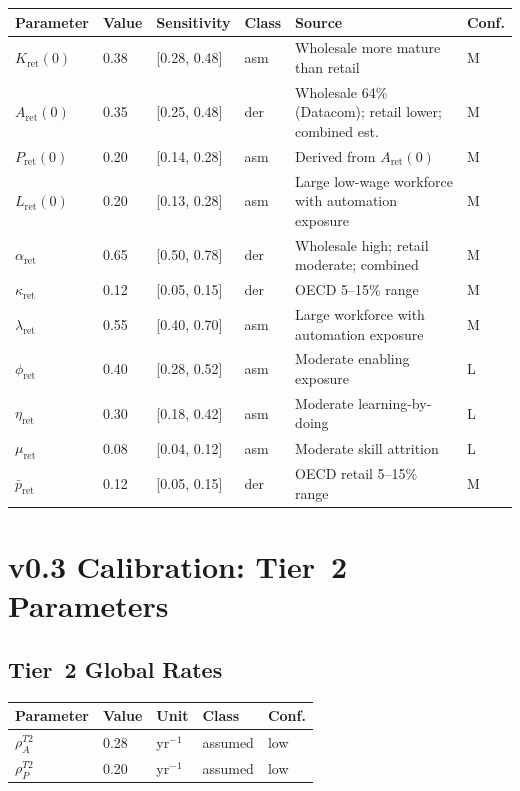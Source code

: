 \documentclass[11pt,a4paper]{article}
\begin{document}
\begin{center}
\begin{tabular}{llllll}
\toprule
Parameter & Value & Sensitivity & Class & Source & Conf.\\
\midrule
$K_{\text{ret}}(0)$ & 0.38 & [0.28, 0.48] & asm & Wholesale more mature than retail & M \\
$A_{\text{ret}}(0)$ & 0.35 & [0.25, 0.48] & der & Wholesale 64\% (Datacom); retail lower; combined est. & M \\
$P_{\text{ret}}(0)$ & 0.20 & [0.14, 0.28] & asm & Derived from $A_{\text{ret}}(0)$ & M \\
$L_{\text{ret}}(0)$ & 0.20 & [0.13, 0.28] & asm & Large low-wage workforce with automation exposure & M \\
$\alpha_{\text{ret}}$ & 0.65 & [0.50, 0.78] & der & Wholesale high; retail moderate; combined & M \\
$\kappa_{\text{ret}}$ & 0.12 & [0.05, 0.15] & der & OECD 5--15\% range & M \\
$\lambda_{\text{ret}}$ & 0.55 & [0.40, 0.70] & asm & Large workforce with automation exposure & M \\
$\phi_{\text{ret}}$ & 0.40 & [0.28, 0.52] & asm & Moderate enabling exposure & L \\
$\eta_{\text{ret}}$ & 0.30 & [0.18, 0.42] & asm & Moderate learning-by-doing & L \\
$\mu_{\text{ret}}$ & 0.08 & [0.04, 0.12] & asm & Moderate skill attrition & L \\
$\bar{p}_{\text{ret}}$ & 0.12 & [0.05, 0.15] & der & OECD retail 5--15\% range & M \\
\bottomrule
\end{tabular}
\end{center}

\section{v0.3 Calibration: Tier~2 Parameters}
\label{sec:cal_t2}

\subsection{Tier~2 Global Rates}

\begin{center}
\begin{tabular}{lllll}
\toprule
Parameter & Value & Unit & Class & Conf. \\
\midrule
$\rho_A^{T2}$ & 0.28 & yr$^{-1}$ & assumed & low \\
$\rho_P^{T2}$ & 0.20 & yr$^{-1}$ & assumed & low \\
\bottomrule
\end{tabular}
\end{center}
\end{document}
